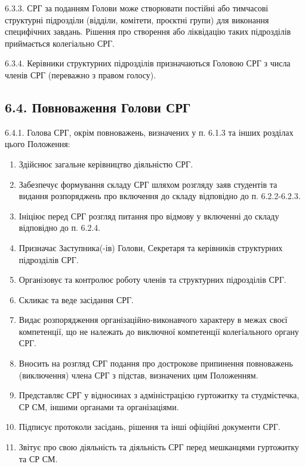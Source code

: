     6.3.3. СРГ за поданням Голови може створювати постійні або тимчасові структурні підрозділи (відділи, комітети, проєктні групи) для виконання специфічних завдань. Рішення про створення або ліквідацію таких підрозділів приймається колегіально СРГ.

    6.3.4. Керівники структурних підрозділів призначаються Головою СРГ з числа членів СРГ (переважно з правом голосу).

\subsection*{6.4. Повноваження Голови СРГ}
    6.4.1. Голова СРГ, окрім повноважень, визначених у п. 6.1.3 та інших розділах цього Положення:

        \begin{enumerate}[label=\alph*)]
            \item Здійснює загальне керівництво діяльністю СРГ.
            \item Забезпечує формування складу СРГ шляхом розгляду заяв студентів та видання розпоряджень про включення до складу відповідно до п. 6.2.2-6.2.3.
            \item Ініціює перед СРГ розгляд питання про відмову у включенні до складу відповідно до п. 6.2.4.
            \item Призначає Заступника(-ів) Голови, Секретаря та керівників структурних підрозділів СРГ.
            \item Організовує та контролює роботу членів та структурних підрозділів СРГ.
            \item Скликає та веде засідання СРГ.
            \item Видає розпорядження організаційно-виконавчого характеру в межах своєї компетенції, що не належать до виключної компетенції колегіального органу СРГ.
            \item Вносить на розгляд СРГ подання про дострокове припинення повноважень (виключення) члена СРГ з підстав, визначених цим Положенням.
            \item Представляє СРГ у відносинах з адміністрацією гуртожитку та студмістечка, СР СМ, іншими органами та організаціями.
            \item Підписує протоколи засідань, рішення та інші офіційні документи СРГ.
            \item Звітує про свою діяльність та діяльність СРГ перед мешканцями гуртожитку та СР СМ.
        \end{enumerate}


